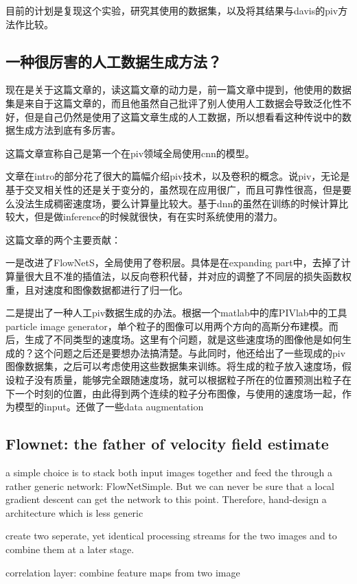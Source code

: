 \documentclass[UTF8]{ctexart}
\begin{document}
目前的计划是复现这个实验，研究其使用的数据集，以及将其结果与davis的piv方法作比较。


\subsection{一种很厉害的人工数据生成方法？}

现在是关于这篇文章\cite{cai_dense_2019}的，读这篇文章的动力是，前一篇文章中提到，他使用的数据集是来自于这篇文章的，而且他虽然自己批评了别人使用人工数据会导致泛化性不好，但是自己仍然是使用了这篇文章生成的人工数据，所以想看看这种传说中的数据生成方法到底有多厉害。

这篇文章宣称自己是第一个在piv领域全局使用cnn的模型。

文章在intro的部分花了很大的篇幅介绍piv技术，以及卷积的概念。说piv，无论是基于交叉相关性的还是关于变分的，虽然现在应用很广，而且可靠性很高，但是要么没法生成稠密速度场，要么计算量比较大。基于dnn的虽然在训练的时候计算比较大，但是做inference的时候就很快，有在实时系统使用的潜力。

这篇文章的两个主要贡献：

一是改进了FlowNetS，全局使用了卷积层。具体是在expanding part中，去掉了计算量很大且不准的插值法，以反向卷积代替，并对应的调整了不同层的损失函数权重，且对速度和图像数据都进行了归一化。

二是提出了一种人工piv数据生成的办法。根据一个matlab中的库PIVlab中的工具particle image generator，单个粒子的图像可以用两个方向的高斯分布建模。而后，生成了不同类型的速度场。这里有个问题，就是这些速度场的图像他是如何生成的？这个问题之后还是要想办法搞清楚。与此同时，他还给出了一些现成的piv图像数据集，之后可以考虑使用这些数据集来训练。将生成的粒子放入速度场，假设粒子没有质量，能够完全跟随速度场，就可以根据粒子所在的位置预测出粒子在下一个时刻的位置，由此得到两个连续的粒子分布图像，与使用的速度场一起，作为模型的input。还做了一些data augmentation


\subsection{Flownet: the father of velocity field estimate}

a simple choice is to stack both input images together and feed the through a rather generic network: FlowNetSimple.
But we can never be sure that a local gradient descent can get the network to this point.
Therefore, hand-design a architecture which is less generic

create two seperate, yet identical processing streams for the two images and to combine them at a later stage.

correlation layer: combine feature maps from two image



\end{document}
